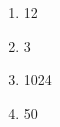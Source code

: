 \documentclass[11pt]{article}
\begin{document}
\begin{enumerate}
    \item 12
    \item 3
    \item 1024
    \item 50
\end{enumerate}
\end{document}
